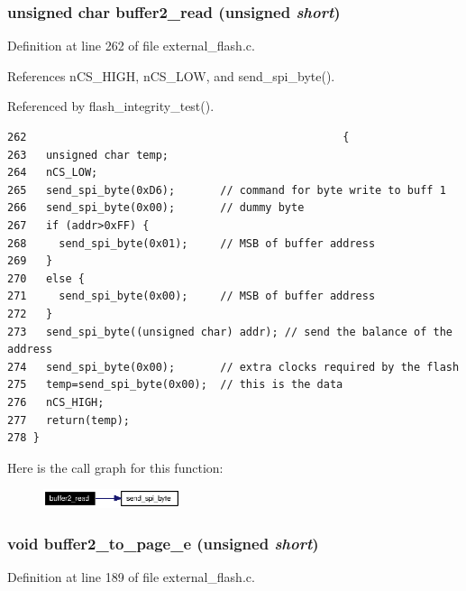 \subsubsection{\setlength{\rightskip}{0pt plus 5cm}unsigned char buffer2\_\-read (unsigned {\em short})}\label{external__flash_8h_a16}




Definition at line 262 of file external\_\-flash.c.

References n\-CS\_\-HIGH, n\-CS\_\-LOW, and send\_\-spi\_\-byte().

Referenced by flash\_\-integrity\_\-test().

\footnotesize\begin{verbatim}262                                                 {
263   unsigned char temp;
264   nCS_LOW;
265   send_spi_byte(0xD6);       // command for byte write to buff 1
266   send_spi_byte(0x00);       // dummy byte
267   if (addr>0xFF) {
268     send_spi_byte(0x01);     // MSB of buffer address
269   }
270   else {
271     send_spi_byte(0x00);     // MSB of buffer address
272   }  
273   send_spi_byte((unsigned char) addr); // send the balance of the address
274   send_spi_byte(0x00);       // extra clocks required by the flash
275   temp=send_spi_byte(0x00);  // this is the data 
276   nCS_HIGH; 
277   return(temp);
278 }
\end{verbatim}\normalsize 




Here is the call graph for this function:\begin{figure}[H]
\begin{center}
\leavevmode
\includegraphics[width=114pt]{external__flash_8h_a16_cgraph}
\end{center}
\end{figure}
\subsubsection{\setlength{\rightskip}{0pt plus 5cm}void buffer2\_\-to\_\-page\_\-e (unsigned {\em short})}\label{external__flash_8h_a11}




Definition at line 189 of file external\_\-flash.c.

